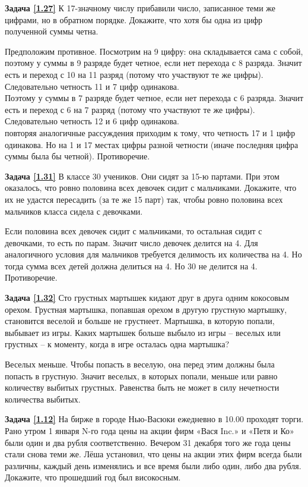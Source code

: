 \textbf{Задача \ref{1.27}}
К 17-значному числу прибавили число, записанное теми же цифрами, но в обратном порядке. Докажите, что хотя бы одна из цифр полученной суммы четна.
\begin{prf}
	Предположим противное. Посмотрим на 9 цифру: она складывается сама с собой, поэтому у суммы в 9 разряде будет четное, если нет перехода с 8 разряда. Значит есть и переход с 10 на 11 разряд (потому что участвуют те же цифры). Следовательно четность 11 и 7 цифр одинакова. \\ Поэтому у суммы в 7 разряде будет четное, если нет перехода с 6 разряда. Значит есть и переход с 6 на 7 разряд (потому что участвуют те же цифры). Следовательно четность 12 и 6 цифр одинакова.
	\\ повторяя аналогичные рассуждения приходим к тому, что четность 17 и 1 цифр одинакова.
	Но на 1 и 17 местах цифры разной четности (иначе последняя цифра суммы была бы четной). Противоречие.
\end{prf}

\textbf{Задача \ref{1.31}}
	В классе 30 учеников. Они сидят за 15-ю партами. При этом оказалось, что ровно половина всех девочек сидит с мальчиками. Докажите, что их не удастся пересадить (за те же 15 парт) так, чтобы ровно половина всех мальчиков класса сидела с девочками.
\begin{prf}
	Если половина всех девочек сидит с мальчиками, то остальная сидит с девочками, то есть по парам. Значит число девочек делится на 4. Для аналогичного условия для мальчиков требуется делимость их количества на 4. Но тогда сумма всех детей должна делиться на 4. Но 30 не делится на 4. Противоречие.
\end{prf}

\textbf{Задача \ref{1.32}}
	Сто грустных мартышек кидают друг в друга одним кокосовым орехом. Грустная мартышка, попавшая орехом в другую грустную мартышку, становится веселой и больше не грустнеет. Мартышка, в которую попали, выбывает из игры. Каких мартышек больше выбыло из игры -- веселых или грустных -- к моменту, когда в игре осталась одна мартышка?
\begin{prf}
	Веселых меньше. Чтобы попасть в веселую, она перед этим должны была попасть в грустную. Значит веселых, в которых попали, меньше или равно количеству выбитых грустных. Равенства быть не может в силу нечетности количества выбитых.
\end{prf}

\textbf{Задача \ref{1.12}}
	На бирже в городе Нью-Васюки ежедневно в 10.00 проходят торги. Рано утром 1 января N-го года цены на акции фирм «Вася Inc.» и «Петя и Ко» были один и два рубля соответственно. Вечером 31 декабря того же года цены стали снова теми же. Лёша установил, что цены на акции этих фирм всегда были различны, каждый день изменялись и все время были либо один, либо два рубля. Докажите, что прошедший год был високосным.

